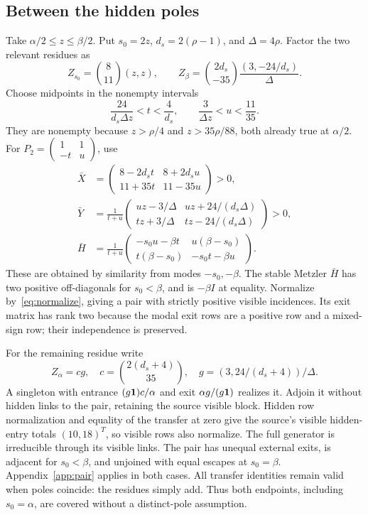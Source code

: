 \subsection{Between the hidden poles}
Take $\alpha/2\le z\le\beta/2$. Put $s_0=2z$, $d_s=2(\rho-1)$, and $\Delta=4\rho$. Factor the two relevant residues as
\begin{equation}
 Z_{s_0}=\binom8{11}(z,z),\qquad
 Z_\beta=\binom{2d_s}{-35}\frac{(3,-24/d_s)}{\Delta}.
\end{equation}
Choose midpoints in the nonempty intervals
\begin{equation}
 \frac{24}{d_s\Delta z}<t<\frac4{d_s},\qquad
 \frac3{\Delta z}<u<\frac{11}{35}.\label{eq:twomodeintervals}
\end{equation}
They are nonempty because $z>\rho/4$ and $z>35\rho/88$, both already true at $\alpha/2$. For $P_2=\left(\begin{smallmatrix}1&1\\-t&u\end{smallmatrix}\right)$, use
\begin{align}
 \bar X&=\begin{pmatrix}8-2d_st&8+2d_su\\11+35t&11-35u\end{pmatrix}>0,\\
 \bar Y&=\frac1{t+u}\begin{pmatrix}uz-3/\Delta&uz+24/(d_s\Delta)\\tz+3/\Delta&tz-24/(d_s\Delta)\end{pmatrix}>0,\\
 \bar H&=\frac1{t+u}\begin{pmatrix}-s_0u-\beta t&u(\beta-s_0)\\t(\beta-s_0)&-s_0t-\beta u\end{pmatrix}.
\end{align}
These are obtained by similarity from modes $-s_0,-\beta$. The stable Metzler $\bar H$ has two positive off-diagonals for $s_0<\beta$, and is $-\beta I$ at equality. Normalize by~\eqref{eq:normalize}, giving a pair with strictly positive visible incidences. Its exit matrix has rank two because the modal exit rows are a positive row and a mixed-sign row; their independence is preserved.

For the remaining residue write
\begin{equation}
 Z_\alpha=cg,\quad c=\binom{2(d_s+4)}{35},\quad
 g=(3,24/(d_s+4))/\Delta.
\end{equation}
A singleton with entrance $(g\mathbf 1)c/\alpha$ and exit $\alpha g/(g\mathbf 1)$ realizes it. Adjoin it without hidden links to the pair, retaining the source visible block. Hidden row normalization and equality of the transfer at zero give the source's visible hidden-entry totals $(10,18)^T$, so visible rows also normalize. The full generator is irreducible through its visible links. The pair has unequal external exits, is adjacent for $s_0<\beta$, and unjoined with equal escapes at $s_0=\beta$. Appendix~\ref{app:pair} applies in both cases. All transfer identities remain valid when poles coincide: the residues simply add. Thus both endpoints, including $s_0=\alpha$, are covered without a distinct-pole assumption.


